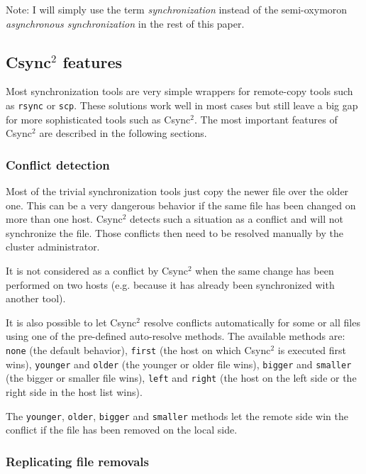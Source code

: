 \documentclass[a4paper,twocolumn]{article}
\def\csync2{{\sc Csync$^{2}$}}
\begin{document}
\hspace{0.2cm}

Note: I will simply use the term {\it synchronization} instead of the
semi-oxymoron {\it asynchronous synchronization} in the rest of this paper.

\subsection{\csync2 features}

Most synchronization tools are very simple wrappers for remote-copy tools such
as {\tt rsync} or {\tt scp}. These solutions work well in most cases but
still leave a big gap for more sophisticated tools such as \csync2. The most
important features of \csync2 are described in the following sections.

\subsubsection{Conflict detection}

\label{confl_detect}

Most of the trivial synchronization tools just copy the newer file over the
older one. This can be a very dangerous behavior if the same file has been
changed on more than one host. \csync2 detects such a situation as a conflict
and will not synchronize the file.  Those conflicts then need to be resolved
manually by the cluster administrator.

It is not considered as a conflict by \csync2 when the same change has been
performed on two hosts (e.g. because it has already been synchronized with
another tool).

It is also possible to let \csync2 resolve conflicts automatically for some or
all files using one of the pre-defined auto-resolve methods. The available
methods are: {\tt none} (the default behavior), {\tt first} (the host on which
\csync2 is executed first wins), {\tt younger} and {\tt older} (the younger or
older file wins), {\tt bigger} and {\tt smaller} (the bigger or smaller file
wins), {\tt left} and {\tt right} (the host on the left side or the right side
in the host list wins).

The {\tt younger}, {\tt older}, {\tt bigger} and {\tt smaller} methods let the
remote side win the conflict if the file has been removed on the local side.

\subsubsection{Replicating file removals}
\end{document}
